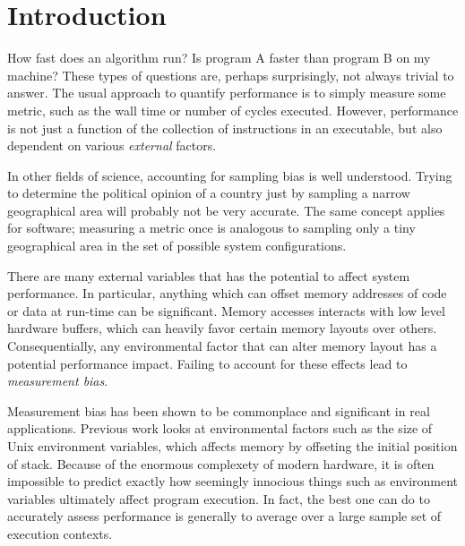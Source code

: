 \documentclass[a4paper,10pt,twocolumn,twoside]{article}
\begin{document}
\section{Introduction}

How fast does an algorithm run?
Is program A faster than program B on my machine?
These types of questions are, perhaps surprisingly, not always trivial to answer.
The usual approach to quantify performance is to simply measure some metric, such as the wall time or number of cycles executed.
However, performance is not just a function of the collection of instructions in an executable, but also dependent on various \emph{external} factors.

In other fields of science, accounting for sampling bias is well understood.
Trying to determine the political opinion of a country just by sampling a narrow geographical area will probably not be very accurate.
The same concept applies for software; measuring a metric once is analogous to sampling only a tiny geographical area in the set of possible system configurations.

There are many external variables that has the potential to affect system performance.
In particular, anything which can offset memory addresses of code or data at run-time can be significant.
Memory accesses interacts with low level hardware buffers, which can heavily favor certain memory layouts over others.
Consequentially, any environmental factor that can alter memory layout has a potential performance impact.
Failing to account for these effects lead to \emph{measurement bias}. 

Measurement bias has been shown to be commonplace and significant in real applications.
Previous work looks at environmental factors such as the size of Unix environment variables, which affects memory by offseting the initial position of stack.
Because of the enormous complexety of modern hardware, it is often impossible to predict exactly how seemingly innocious things such as environment variables ultimately affect program execution.
In fact, the best one can do to accurately assess performance is generally to average over a large sample set of execution contexts. \cite{Mytkowicz:2008:OE&MB, Mytkowicz:2009:WrongData, Mytkowicz:2008:Easy}
\end{document}

